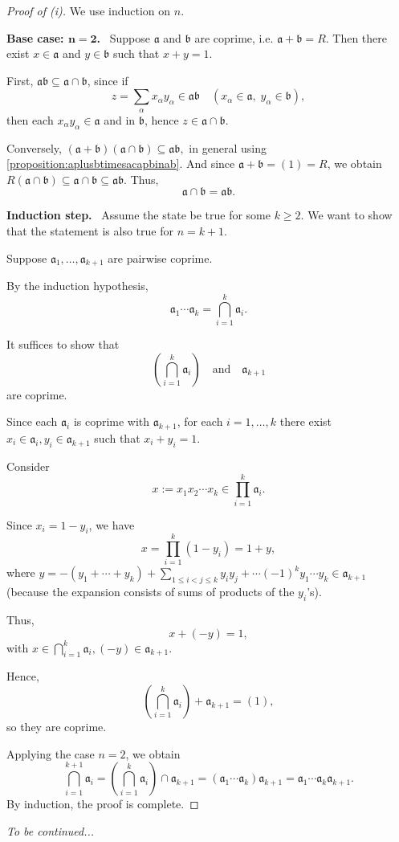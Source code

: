 \begin{proof}[Proof of (i)]
We use induction on $n$.

\textbf{Base case: $\mathbf{n=2}$.}  
Suppose $\mathfrak{a}$ and $\mathfrak{b}$ are coprime, i.e. \(\mathfrak{a} + \mathfrak{b} = R\). Then there exist $x \in \mathfrak{a}$ and $y \in \mathfrak{b}$ such that \(x + y = 1\).

First, $\mathfrak{a}\mathfrak{b} \subseteq \mathfrak{a} \cap \mathfrak{b}$, since if
\[
z = \sum_{\alpha} x_\alpha y_\alpha \in \mathfrak{ab}
\quad (x_\alpha \in \mathfrak{a},\; y_\alpha \in \mathfrak{b}),
\]
then each $x_\alpha y_\alpha \in \mathfrak{a}$ and in $\mathfrak{b}$, hence
$z \in \mathfrak{a} \cap \mathfrak{b}$.

Conversely, 
\((\mathfrak{a} + \mathfrak{b})(\mathfrak{a} \cap \mathfrak{b}) \subseteq \mathfrak{a}\mathfrak{b},\) in general using \autoref{proposition:aplusbtimesacapbinab}. And since $\mathfrak{a} + \mathfrak{b} = (1) = R$, we obtain \(R(\mathfrak{a} \cap \mathfrak{b}) \subseteq \mathfrak{a} \cap \mathfrak{b} \subseteq \mathfrak{a}\mathfrak{b}.\)
Thus,
\[
\mathfrak{a} \cap \mathfrak{b} = \mathfrak{a}\mathfrak{b}.
\]

\textbf{Induction step.}  
Assume the state be true for some \(k \ge 2\). We want to show that the statement is also true for \(n = k+1\).

Suppose $\mathfrak{a}_1, \dots, \mathfrak{a}_{k+1}$ are pairwise coprime.

By the induction hypothesis,
\[
    \mathfrak{a}_1 \cdots \mathfrak{a}_k
=
\bigcap_{i=1}^{k} \mathfrak{a}_i.
\]

It suffices to show that
\[
\left( \bigcap_{i=1}^{k} \mathfrak{a}_i \right)
\quad \text{and} \quad
\mathfrak{a}_{k+1}
\]
are coprime.

Since each $\mathfrak{a}_i$ is coprime with $\mathfrak{a}_{k+1}$, for each
$i=1,\dots,k$ there exist \(x_i \in \mathfrak{a}_i, y_i \in \mathfrak{a}_{k+1}\)
such that \(x_i + y_i = 1\).

Consider
\[
x := x_1 x_2 \cdots x_k
\in
\prod_{i=1}^{k} \mathfrak{a}_i.
\]

Since $x_i = 1 - y_i$, we have
\[
x
=
\prod_{i=1}^{k} (1 - y_i)
=
1 + y,
\]
where $y = -(y_1 + \cdots + y_k) + \sum_{1 \le i < j \le k} y_iy_j + \cdots (-1)^k y_1\cdots y_k \in \mathfrak{a}_{k+1}$ (because the expansion consists of sums of
products of the $y_i$'s).

Thus,
\[
x + (-y) = 1,
\]
with \(x \in \bigcap_{i=1}^{k} \mathfrak{a}_i, (-y) \in \mathfrak{a}_{k+1}.\)

Hence,
\[
\left( \bigcap_{i=1}^{k} \mathfrak{a}_i \right)
+
\mathfrak{a}_{k+1}
=
(1),
\]
so they are coprime.

Applying the case $n=2$, we obtain
\[
\bigcap_{i=1}^{k+1} \mathfrak{a}_i
=
\left( \bigcap_{i=1}^{k} \mathfrak{a}_i \right)
\cap
\mathfrak{a}_{k+1}
=
(\mathfrak{a}_1 \cdots \mathfrak{a}_k)
\mathfrak{a}_{k+1}
=
\mathfrak{a}_1 \cdots \mathfrak{a}_k \mathfrak{a}_{k+1}.
\]
By induction, the proof is complete.
\end{proof}
\emph{To be continued...}
